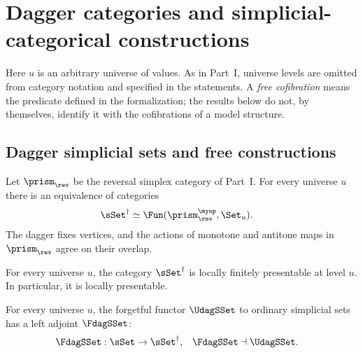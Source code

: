 \section{Dagger categories and simplicial-categorical constructions}

Here $u$ is an arbitrary universe of values.
As in Part~I, universe levels are omitted from category notation and specified in the statements.
A \emph{free cofibration} means the predicate defined in the formalization;
the results below do not, by themselves, identify it with the cofibrations of a model structure.

\subsection{Dagger simplicial sets and free constructions}

\begin{resultblock}
\begin{theorem}
Let $\prism_{\rev}$ be the reversal simplex category of Part~I.
For every universe $u$ there is an equivalence of categories
\begin{align}
  \sSet^{\dag}
    &\simeq \Fun(\prism_{\rev}^{\myop},\Set_u).
\end{align}
The dagger fixes vertices, and the actions of monotone and antitone maps in $\prism_{\rev}$ agree on their overlap.
\end{theorem}
\end{resultblock}

\begin{resultblock}
\begin{theorem}
For every universe $u$, the category $\sSet^{\dag}$ is locally finitely presentable at level $u$.
In particular, it is locally presentable.
\end{theorem}
\end{resultblock}

\begin{resultblock}
\begin{theorem}
For every universe $u$, the forgetful functor $\UdagSSet$ to ordinary simplicial sets has a left adjoint $\FdagSSet$:
\begin{align}
  \FdagSSet:\sSet&\to\sSet^{\dag},
  &\FdagSSet&\dashv\UdagSSet.
\end{align}
\end{theorem}
\end{resultblock}

